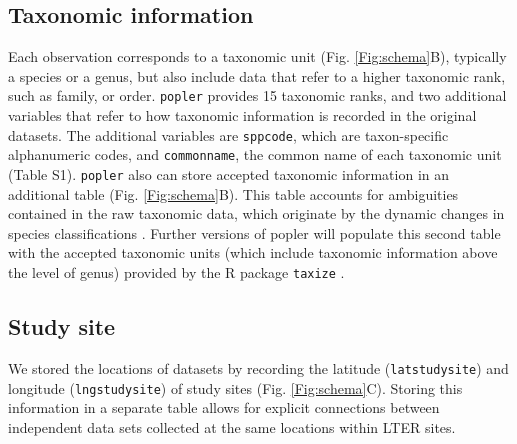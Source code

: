 \documentclass{article}\usepackage[]{graphicx}\usepackage[]{color}
\begin{document}
\subsection*{Taxonomic information}
Each observation corresponds to a taxonomic unit (Fig. \ref{Fig:schema}B), typically a species or a genus, but also include data that refer to a higher taxonomic rank, such as family, or order. %
\texttt{popler} provides 15 taxonomic ranks, and two additional variables that refer to how taxonomic information is recorded in the original datasets. The additional variables are \texttt{sppcode}, which are taxon-specific alphanumeric codes, and \texttt{common\textunderscore name}, the common name of each taxonomic unit (Table S1). \texttt{popler} also can store accepted taxonomic information in an additional table (Fig. \ref{Fig:schema}B). This table accounts for ambiguities contained in the raw taxonomic data, which originate by the dynamic changes in species classifications \citep{Chamberlain2013}. Further versions of popler will populate this second table with the accepted taxonomic units (which include  taxonomic information above the level of genus) provided by the R package \texttt{taxize} \citep{Chamberlain2013}.

\subsection*{Study site}
We stored the locations of datasets by recording the latitude (\texttt{lat\textunderscore study\textunderscore site}) and longitude (\texttt{lng\textunderscore study\textunderscore site}) of study sites (Fig. \ref{Fig:schema}C). Storing this information in a separate table allows for explicit connections between independent data sets collected at the same locations within LTER sites. 
\end{document}
